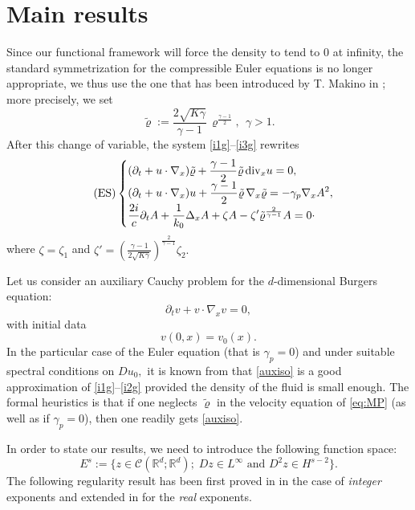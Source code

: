\documentclass[11pt,twoside]{amsart}
\newcommand{\bFormula}[1]{\begin{equation} \label{#1}}
\newcommand{\eF}{\end{equation}}
\newcommand{\Div}{{\rm div}_x}
\newcommand{\Grad}{\nabla_x}
\newcommand{\vr}{\varrho}
\newcommand\R{\mathbb{R}}
\newcommand{\ds}{\displaystyle}
\def\cC{{\mathcal C}}
\begin{document}
\section{Main results}\label{main}
 


Since our functional framework will force the density to tend to $0$ at infinity, the standard  
symmetrization for the compressible Euler equations is no longer appropriate, we thus use the one that has been introduced by T. Makino in \cite{Ma}; more precisely, we set 
\begin{equation}\label{eq:mak}
\tilde \varrho:=\frac{2\sqrt{K\gamma}}{\gamma-1}\,\varrho^{\frac{\gamma-1}2}, \ \ \gamma> 1 .
\end{equation}
After this change of variable, the system \eqref{i1g}--\eqref{i3g} rewrites
\begin{align}\tag{ES}
\begin{cases} 
 \ds (\partial_t+u\cdot\nabla_x)\tilde \vr+\frac{\gamma-1}2 \tilde \vr\,\Div u=0, \\
 \ds (\partial_t+u\cdot\nabla_x)u+\frac{\gamma-1}2\tilde \vr \,\nabla_x\tilde \vr=-\gamma_p\nabla_x A^2, \\
\ds  \frac{2i}{c}\partial_t A+\frac{1}{k_0}\Delta_x A
+\zeta A
-\zeta' \tilde \vr^{\frac{2}{\gamma-1}} A=0\cdotp
\end{cases}\label{eq:MP}
\end{align} 
where $\zeta=\zeta_1$ and $\zeta'=\left(\frac{\gamma-1}{2\sqrt{K\gamma}}\right)^{\frac{2}{\gamma-1}}\zeta_2.$

\medbreak
Let us consider an auxiliary Cauchy problem for the $d$-dimensional Burgers equation:
\begin{equation}
\label{auxiso}
\partial_t  v +  v \cdot \Grad  v = 0,
\end{equation}
with initial data 
\bFormula{auxiso0}
 v(0,x)=v_0(x).
\eF
In the particular case of the 
Euler equation (that is $\gamma_p=0$) and under suitable spectral conditions on $Du_0,$
it is known from \cite{G,GS} that \eqref{auxiso} is a good approximation  of  \eqref{i1g}--\eqref{i2g}
provided the density of the fluid is small enough.
The formal heuristics is that if one neglects $\tilde \vr$  in the velocity
equation of \eqref{eq:MP} (as well as if $\gamma_p=0$), then one readily gets
\eqref{auxiso}.

\medbreak

In order to state our results, we need to introduce the following function  space: 
%
$$E^s:=\bigl\{z\in\cC(\R^d;\R^d); \; Dz\in L^\infty \text{ and } D^2z\in H^{s-2}\bigr\} . $$
%
The following regularity result  has  been first proved in \cite{G,GS} in the case of
{\em integer} exponents and extended in \cite{BDDN} for the  \emph{real} exponents. 
\end{document}
